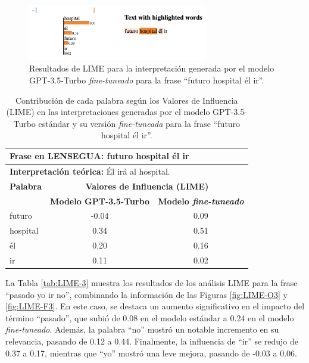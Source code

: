 \begin{figure}[H]
\centering
    \includegraphics[width=0.7\textwidth]{figuras/LIME/LIME-F2.png}
    \caption{Resultados de LIME para la interpretación generada por el modelo GPT-3.5-Turbo \textit{fine-tuneado} para la frase “futuro hospital él ir”.}
    \label{fig:LIME-F2}
\end{figure}

\vspace{0.5cm}
\begin{table}[H]
\centering
    \begin{tabular}{|l|c|c|}
        \hline
        \multicolumn{3}{|l|}{\textbf{Frase en LENSEGUA:} futuro hospital él ir} \\ \hline
        \multicolumn{3}{|l|}{\textbf{Interpretación teórica:} Él irá al hospital.} \\ \hline \hline
        
        \textbf{Palabra} & \multicolumn{2}{c|}{\textbf{Valores de Influencia (LIME)}} \\ 
        \cline{2-3}
         & \textbf{Modelo GPT-3.5-Turbo} & \textbf{Modelo \textit{fine-tuneado}} \\
         
        \hline
        futuro & -0.04 & 0.09 \\
        \hline
        hospital & 0.34 & 0.51 \\
        \hline
        él & 0.20  & 0.16 \\
        \hline
        ir & 0.11  & 0.02 \\
        \hline
        
    \end{tabular}
\caption{Contribución de cada palabra según los Valores de Influencia (LIME) en las interpretaciones generadas por el modelo GPT-3.5-Turbo estándar y su versión \textit{fine-tuneada} para la frase “futuro hospital él ir”.}
\label{tab:LIME-2}
\end{table}

La Tabla \ref{tab:LIME-3} muestra los resultados de los análisis LIME para la frase “pasado yo ir no”, combinando la información de las Figuras \ref{fig:LIME-O3} y \ref{fig:LIME-F3}. En este caso, se destaca un aumento significativo en el impacto del término “pasado”, que subió de 0.08 en el modelo estándar a 0.24 en el modelo \textit{fine-tuneado}. Además, la palabra “no” mostró un notable incremento en su relevancia, pasando de 0.12 a 0.44. Finalmente, la influencia de “ir” se redujo de 0.37 a 0.17, mientras que “yo” mostró una leve mejora, pasando de -0.03 a 0.06.

